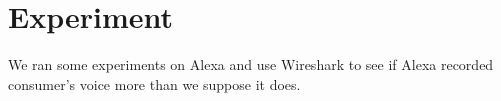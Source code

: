 
%
%
%
%
%

\section{Experiment}

We ran some experiments on Alexa and use Wireshark to see if Alexa recorded consumer's voice more than we suppose it does.

